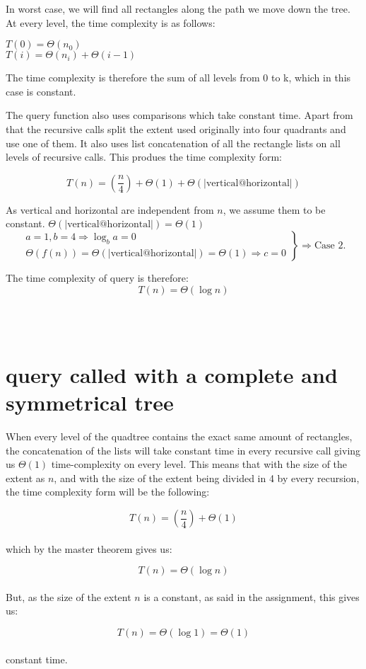\documentclass[12pt, a4paper]{article}
\begin{document}
In worst case, we will find all rectangles along the path we move down the tree. At every level, the time complexity is as follows: 

$T(0)= \Theta(n_0)$\\
$T(i)= \Theta(n_i) + \Theta(i-1)$

The time complexity is therefore the sum of all levels from 0 to k, which in this case is constant.



The query function also uses comparisons which take constant time. Apart from that the recursive calls split the extent used originally into four quadrants and use one of them. It also uses list concatenation of all the rectangle lists on all levels of recursive calls. This produes the time complexity form:

$$T(n)=\left(\frac{n}{4}\right)+\Theta(1)+\Theta(|\text{vertical@horizontal}|)$$

As vertical and horizontal are independent from $n$, we assume them to be constant. $\Theta(|\text{vertical@horizontal}|) = \Theta(1)$\\

\[
\left.
\begin{array}{l}
  a=1, b=4 \Rightarrow \log_ba = 0 \\
  \Theta(f(n)) = \Theta(|\text{vertical@horizontal}|) = \Theta(1) \Rightarrow c = 0
\end{array} \right\} \Rightarrow \text{Case 2.}
\]

The time complexity of query is therefore: $$T(n)=\Theta(\log n)$$

\\
\\
\section{query called with a complete and symmetrical tree}

When every level of the quadtree contains the exact same amount of rectangles, the concatenation of the lists will take constant time in every recursive call giving us $\Theta(1)$ time-complexity on every level. This means that with the size of the extent as $n$, and with the size of the extent being divided in 4 by every recursion, the time complexity form will be the following:

 $$T(n)=\left(\frac{n}{4}\right)+\Theta(1)$$\\

which by the master theorem gives us:

 $$T(n)=\Theta(\log n)$$\\

But, as the size of the extent $n$ is a constant, as said in the assignment, this gives us:

 $$T(n)=\Theta(\log 1)=\Theta(1)$$\\

constant time.
\end{document}
